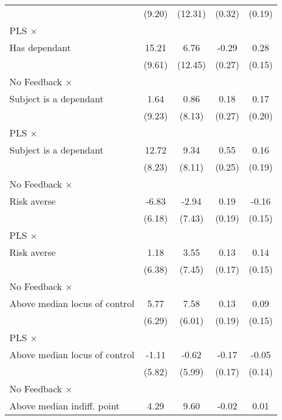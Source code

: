 \begin{table}[htbp]
\begin{tabular}{l*{4}{c}}
                &   (9.20)         &  (12.31)         &   (0.32)         &   (0.19)         \\
\addlinespace
PLS $\times$ \\ Has dependant&    15.21         &     6.76         &    -0.29         &     0.28\sym{*}  \\
                &   (9.61)         &  (12.45)         &   (0.27)         &   (0.15)         \\
\addlinespace
No Feedback $\times$ \\ Subject is a dependant&     1.64         &     0.86         &     0.18         &     0.17         \\
                &   (9.23)         &   (8.13)         &   (0.27)         &   (0.20)         \\
\addlinespace
PLS $\times$ \\ Subject is a dependant&    12.72         &     9.34         &     0.55\sym{**} &     0.16         \\
                &   (8.23)         &   (8.11)         &   (0.25)         &   (0.19)         \\
\addlinespace
No Feedback $\times$ \\ Risk averse&    -6.83         &    -2.94         &     0.19         &    -0.16         \\
                &   (6.18)         &   (7.43)         &   (0.19)         &   (0.15)         \\
\addlinespace
PLS $\times$ \\ Risk averse&     1.18         &     3.55         &     0.13         &     0.14         \\
                &   (6.38)         &   (7.45)         &   (0.17)         &   (0.15)         \\
\addlinespace
No Feedback $\times$ \\ Above median locus of control&     5.77         &     7.58         &     0.13         &     0.09         \\
                &   (6.29)         &   (6.01)         &   (0.19)         &   (0.15)         \\
\addlinespace
PLS $\times$ \\ Above median locus of control&    -1.11         &    -0.62         &    -0.17         &    -0.05         \\
                &   (5.82)         &   (5.99)         &   (0.17)         &   (0.14)         \\
\addlinespace
No Feedback $\times$ \\ Above median indiff. point&     4.29         &     9.60         &    -0.02         &     0.01         \\

\end{tabular}
\end{table}
